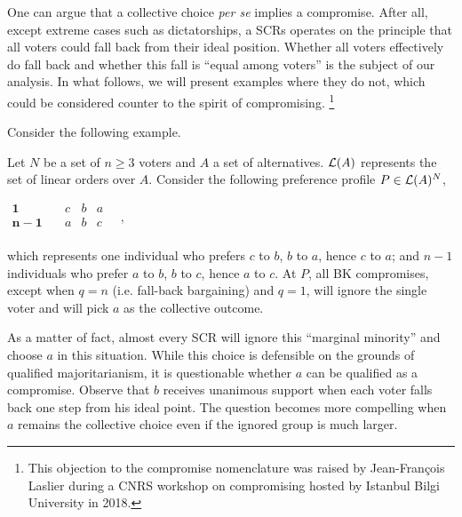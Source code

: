 One can argue that a collective choice \emph{per se} implies a compromise. After all, except extreme cases such as dictatorships,
a \acp{SCR} operates on the principle that all voters could fall back from their ideal position. Whether all voters effectively do fall back and whether this fall is “equal among voters” is the subject of our analysis. In what follows, we will present examples where they do not, which could be considered counter to the spirit of compromising. \footnote{This objection to the compromise nomenclature was raised by Jean-François Laslier during a CNRS workshop on compromising hosted by Istanbul Bilgi University in 2018.}

Consider the following example.
\begin{example}
	\label{ex:ex1}
	Let $N$ be a set of $n ≥ 3$ voters and $A$ a set of alternatives. $\mathcal{L}(A)$ represents the set of linear orders over $A$. Consider the following preference profile $P\in \mathcal{L}(A)^{N}$,
	\begin{center}
		$
		\begin{array}{cccc}
			\mathbf{1} \quad &c&b&a\\
			\mathbf{n-1} \quad &a&b&c\\
		\end{array}\quad ,
		$
	\end{center}
	which represents one individual who prefers $c$ to $b$, $b$ to $a$, hence $c$ to $a$; and $n-1$ individuals who prefer $a$ to $b$, $b$ to $c$, hence $a$ to $c$. At $P$, all \acs{BK} compromises, except when $q=n$ (i.e. fall-back bargaining) and $q=1$, will ignore the single voter and will pick $a$ as the collective outcome. 
\end{example}

As a matter of fact, almost every \ac{SCR} will ignore this “marginal minority” and choose $a$ in this situation. While this choice is defensible on the grounds of qualified majoritarianism, it is questionable whether $a$ can be qualified as a compromise. Observe that $b$ receives unanimous support when each voter falls back one step from his ideal point. The question becomes more compelling when $a$ remains the collective choice even if the ignored group is much larger.

